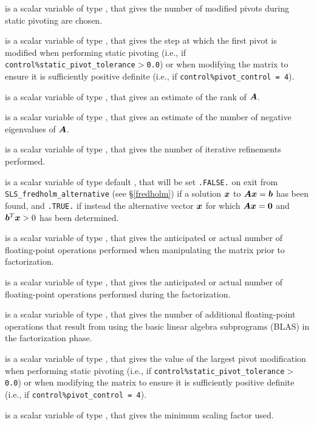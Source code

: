 \documentclass{galahad}
\newcommand{\packagename}{SLS}
\begin{document}
\begin{description}
 is a scalar variable of type \integer,
that gives the number of modified pivots during static pivoting are chosen.

 is a scalar variable of type \integer,
that gives the step at which the first pivot is modified when performing
static pivoting (i.e., if {\tt control\%static\_pivot\_tolerance$>$0.0})
or when modifying the matrix to ensure it is sufficiently positive definite
(i.e., if {\tt control\%pivot\_control = 4}).

 is a scalar variable of type \integer,
that gives an estimate of the rank of ${\bm{A}}$.

 is a scalar variable of type \integer,
that gives an estimate of the number of negative eigenvalues of ${\bm{A}}$.

 is a scalar variable of type \integer,
that gives the number of iterative refinements performed.

 is a scalar variable of type default \logical,
that will be set {\tt .FALSE.} on exit from
{\tt \packagename\_fredholm\_\-alternative} (see \S\ref{fredholm})
if a solution ${\bm{x}}$ to ${\bm{A}} {\bm{x}} = {\bm{b}}$ has been found,
and {\tt .TRUE.} if instead the alternative vector ${\bm{x}}$ for which
${\bm{A}} {\bm{x}} = {\bm{0}}$ and ${\bm{b}}^T {\bm{x}} > 0$ has been determined.

 is a scalar variable of type \longinteger,
that gives the anticipated or actual number of floating-point operations
performed when manipulating the matrix prior to factorization.

 is a scalar variable of type \longinteger,
that gives the anticipated or actual number of floating-point operations
performed during the factorization.

 is a scalar variable of type \longinteger,
that gives the number of additional floating-point operations
that result from using the basic linear algebra subprograms (BLAS)
in the factorization phase.

 is a scalar variable of type \realdp,
that gives the value of the largest pivot modification when performing
static pivoting (i.e., if {\tt control\%static\_pivot\_\-tolerance$>$0.0})
or when modifying the matrix to ensure it is sufficiently positive definite
(i.e., if {\tt control\-\%pivot\_control = 4}).

 is a scalar variable of type \realdp,
that gives the minimum scaling factor used.


\end{description}
\end{document}
